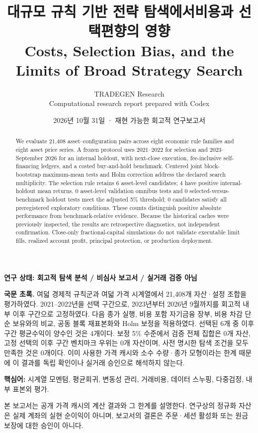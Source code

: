 \documentclass[11pt,a4paper]{article}
\title{\sffamily\bfseries 대규모 규칙 기반 전략 탐색에서\break 비용과 선택편향의 영향\\[5pt]\large Costs, Selection Bias, and the Limits of Broad Strategy Search}
\author{TRADEGEN Research\\\small Computational research report prepared with Codex}
\date{2026년 10월 31일 · 재현 가능한 회고적 연구보고서}
\begin{document}
\maketitle
\thispagestyle{empty}
\begin{center}\small\textbf{연구 상태: 회고적 탐색 분석 / 비심사 보고서 / 실거래 검증 아님}\end{center}
\begin{abstract}
We evaluate 21,408 asset--configuration pairs across eight economic rule families and eight asset price series. A frozen protocol uses 2021--2022 for selection and 2023--September 2026 for an internal holdout, with next-close execution, fee-inclusive self-financing ledgers, and a costed buy-and-hold benchmark. Centered joint block-bootstrap maximum-mean tests and Holm correction address the declared search multiplicity. The selection rule retains 6 asset-level candidates; 4 have positive internal-holdout mean returns. 0 asset-level validation omnibus tests and 0 selected-versus-benchmark holdout tests meet the adjusted 5\% threshold; 0 candidates satisfy all preregistered exploratory conditions. These counts distinguish positive absolute performance from benchmark-relative evidence. Because the historical caches were previously inspected, the results are retrospective diagnostics, not independent confirmation. Close-only fractional-capital simulations do not validate executable limit fills, realized account profit, principal protection, or production deployment.
\end{abstract}
\textbf{국문 초록.} 여덟 경제적 규칙군과 여덟 가격 시계열에서 21,408개 자산·설정 조합을 평가하였다. 2021--2022년을 선택 구간으로, 2023년부터 2026년 9월까지를 회고적 내부 이후 구간으로 고정하였다. 다음 종가 실행, 비용 포함 자기금융 장부, 비용 차감 단순 보유와의 비교, 공동 블록 재표본화와 Holm 보정을 적용하였다. 선택된 6개 중 이후 구간 평균수익이 양수인 것은 4개이다. 보정 5\% 수준에서 검증 전체 집합은 0개 자산, 고정 선택의 이후 구간 벤치마크 우위는 0개 자산이며, 사전 명시한 탐색 조건을 모두 만족한 것은 0개이다. 이미 사용한 가격 캐시와 소수 수량·종가 모형이라는 한계 때문에 이 결과를 독립 확인이나 실거래 승인으로 해석하지 않는다.

\textbf{핵심어:} 시계열 모멘텀, 평균회귀, 변동성 관리, 거래비용, 데이터 스누핑, 다중검정, 내부 표본외 평가.

본 보고서는 공개 가격 캐시의 계산 결과와 그 한계를 설명한다. 연구상의 정규화 자산은 실제 계좌의 실현 순이익이 아니며, 보고서의 결론은 주문·세션 활성화 또는 원금 보장에 대한 승인이 아니다.
\end{document}
